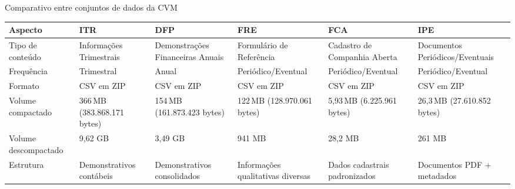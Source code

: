 \begin{board}[!htb]
	\centering
	\caption{Comparativo entre conjuntos de dados da CVM}
	\label{tab:comparativo_cvm}
	\begin{varwidth}{\linewidth}
		\scriptsize
		\begin{tabularx}{\textwidth}{|X|X|X|X|X|X|}
			\hline
			\textbf{Aspecto}     & \textbf{ITR}                      & \textbf{DFP}                       & \textbf{FRE}                                    & \textbf{FCA}                       & \textbf{IPE}                                         \\ \hline
			
			Tipo de conteúdo    & Informações Trimestrais         & Demonstrações Financeiras Anuais & Formulário de Referência                      & Cadastro de Companhia Aberta       & Documentos Periódicos/Eventuais                     \\ \hline
			
			Frequência          & Trimestral                        & Anual                              & Periódico/Eventual                             & Periódico/Eventual                & Periódico/Eventual                                  \\ \hline
			
			Formato              & CSV em ZIP                        & CSV em ZIP                         & CSV em ZIP                                      & CSV em ZIP                         & CSV em ZIP                                           \\ \hline
			
			Volume compactado    & 366\,MB (383.868.171 bytes)       & 154\,MB (161.873.423 bytes)        & 122\,MB (128.970.061 bytes)                     & 5{,}93\,MB (6.225.961 bytes)        & 26{,}3\,MB (27.610.852 bytes)                        \\ \hline
			
			Volume descompactado & 9{,}62 GB                         & 3{,}49 GB                           & 941 MB                                          & 28{,}2 MB                           & 261 MB                                               \\ \hline
			
			Estrutura            & Demonstrativos contábeis         & Demonstrativos consolidados        & Informações qualitativas diversas             & Dados cadastrais padronizados      & Documentos PDF + metadados                           \\ \hline
			

\end{tabularx}
\end{varwidth}
\end{board}
